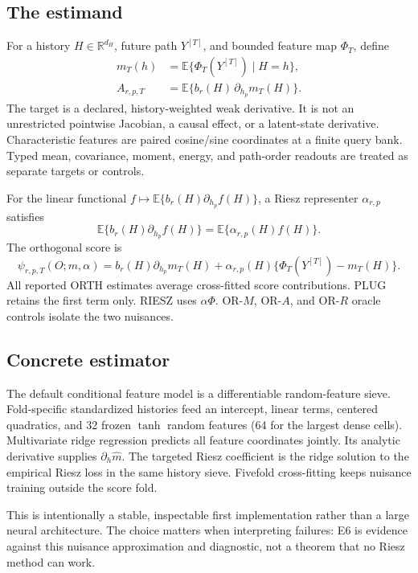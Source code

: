 \documentclass[11pt]{article}
\newcommand{\R}{\mathbb{R}}
\newcommand{\E}{\mathbb{E}}
\begin{document}
\subsection{The estimand}

For a history $H\in\R^{d_H}$, future path $Y^{[T]}$, and bounded feature map $\Phi_T$, define
\begin{align}
m_T(h) &= \E\{\Phi_T(Y^{[T]})\mid H=h\},\\
A_{r,p,T} &= \E\{b_r(H)\,\partial_{h_p}m_T(H)\}.
\end{align}
The target is a declared, history-weighted weak derivative.  It is not an unrestricted pointwise Jacobian, a causal effect, or a latent-state derivative.  Characteristic features are paired cosine/sine coordinates at a finite query bank.  Typed mean, covariance, moment, energy, and path-order readouts are treated as separate targets or controls.

For the linear functional $f\mapsto\E\{b_r(H)\partial_{h_p}f(H)\}$, a Riesz representer $\alpha_{r,p}$ satisfies
\begin{equation}
\E\{b_r(H)\partial_{h_p}f(H)\}=\E\{\alpha_{r,p}(H)f(H)\}.
\end{equation}
The orthogonal score is
\begin{equation}
\psi_{r,p,T}(O;m,\alpha)=
b_r(H)\partial_{h_p}m_T(H)
+\alpha_{r,p}(H)\{\Phi_T(Y^{[T]})-m_T(H)\}.
\end{equation}
All reported ORTH estimates average cross-fitted score contributions.  PLUG retains the first term only.  RIESZ uses $\alpha\Phi$.  OR-$M$, OR-$A$, and OR-$R$ oracle controls isolate the two nuisances.

\subsection{Concrete estimator}

The default conditional feature model is a differentiable random-feature sieve.  Fold-specific standardized histories feed an intercept, linear terms, centered quadratics, and 32 frozen $\tanh$ random features (64 for the largest dense cells).  Multivariate ridge regression predicts all feature coordinates jointly.  Its analytic derivative supplies $\partial_h\widehat m$.  The targeted Riesz coefficient is the ridge solution to the empirical Riesz loss in the same history sieve.  Fivefold cross-fitting keeps nuisance training outside the score fold.

This is intentionally a stable, inspectable first implementation rather than a large neural architecture.  The choice matters when interpreting failures: E6 is evidence against this nuisance approximation and diagnostic, not a theorem that no Riesz method can work.
\end{document}
